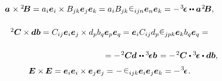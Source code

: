\begin{otherlanguage}{russian}
\nopagebreak\begin{equation*}
\begin{array}{c}
\bm{a} \hspace{0.1ex} \times {^2\hspace{-0.16em}\bm{B}} = a_i \bm{e}_i \times B_{jk} \bm{e}_j \bm{e}_k \hspace{-0.1ex} = \tikzmark{BeginVectorCrossTensor} a_i B_{jk} \hspace{0.1ex} \levicivita_{ijn} \tikzmark{EndVectorCrossTensor} \bm{e}_n \bm{e}_k = - \hspace{.2ex} \levicivitatensor \dotdotp {\bm{a}\hspace{0.12ex}{^2\!\bm{B}}},\\[1.6em]
%
{^2\hspace{-0.05ex}\bm{C}} \times \hspace{-0.1ex} \bm{d} \bm{b} = C_{ij} \bm{e}_i \bm{e}_j \hspace{-0.1ex} \times d_p b_q \bm{e}_p \bm{e}_q \hspace{-0.1ex} = \bm{e}_i C_{ij} d_p \tikzmark{BeginTensorCrossTensor} \levicivita_{jpk} \tikzmark{EndTensorCrossTensor} \bm{e}_k b_q \bm{e}_q = \\[1.6em]
\hspace{12.5em} =
- \hspace{.2ex} {^2\hspace{-0.05ex}\bm{C}} \hspace{-0.1ex} \bm{d} \hspace{0.12ex} \dotdotp \levicivitatensor \bm{b} \hspace{0.2ex} =
- \hspace{.2ex} {^2\hspace{-0.05ex}\bm{C}} \dotp \levicivitatensor \dotp \bm{d} \bm{b},\\
\end{array}
\end{equation*}%
%
%
%
\vspace{-0.32em}\begin{equation}\label{iso:twothree}
\bm{E} \times \hspace{-0.16ex} \bm{E} = \bm{e}_i \bm{e}_i \times \bm{e}_j \bm{e}_j = \hspace{-0.4ex} \tikzmark{BeginECrossE} - \hspace{-0.2ex} \levicivita_{ijk} \bm{e}_i \bm{e}_j \bm{e}_k \tikzmark{EndECrossE} = - \hspace{.2ex} \levicivitatensor \hspace{0.1ex}.
\end{equation}
%


\end{otherlanguage}

